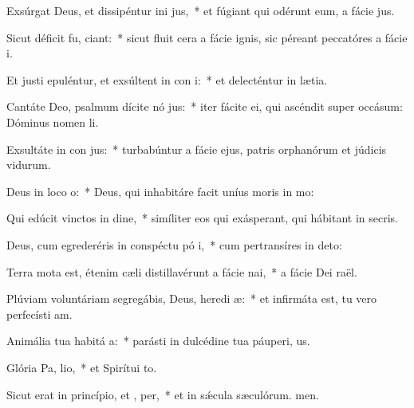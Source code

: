 \item Exsúrgat Deus, et dissipéntur ini jus,~* et fúgiant qui odérunt eum, a fácie jus.
\item Sicut déficit fu, ciant:~* sicut fluit cera a fácie ignis, sic péreant peccatóres a fácie i.
\item Et justi epuléntur, et exsúltent in con i:~* et delecténtur in lætia.
\item Cantáte Deo, psalmum dícite nó jus:~* iter fácite ei, qui ascéndit super occásum: Dóminus nomen li.
\item Exsultáte in con jus:~* turbabúntur a fácie ejus, patris orphanórum et júdicis vidurum.
\item Deus in loco  o:~* Deus, qui inhabitáre facit uníus moris in mo:
\item Qui edúcit vinctos in dine,~* simíliter eos qui exásperant, qui hábitant in secris.
\item Deus, cum egrederéris in conspéctu pó i,~* cum pertransíres in deto:
\item Terra mota est, étenim cæli distillavérunt a fácie  nai,~* a fácie Dei raël.
\item Plúviam voluntáriam segregábis, Deus, heredi æ:~* et infirmáta est, tu vero perfecísti am.
\item Animália tua habitá  a:~* parásti in dulcédine tua páuperi, us.
\item Glória Pa,  lio,~* et Spirítui to.
\item Sicut erat in princípio, et ,  per,~* et in sǽcula sæculórum. men.
